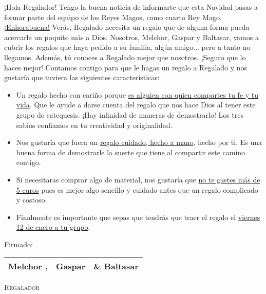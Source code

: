 \documentclass[11pt]{article}
\DeclareRobustCommand{\augiefamily}{%
  \fontfamily{augie}\fontseries{m}\fontshape{n}\selectfont}
\newcommand{\receiver}{Regalado\xspace}
\newcommand{\giver}{Regalador\xspace}
\begin{document}
\bsifamily


¡Hola \giver!
Tengo la buena noticia de informarte que esta Navidad pasas a formar parte del equipo de los Reyes Magos, como cuarto Rey Mago. \ul{¡Enhorabuena!}
Verás, \LARGE{\receiver} \large necesita un regalo que de alguna forma pueda acercarle un poquito más a Dios.
%
Nosotros, Melchor, Gaspar y Baltasar, vamos a cubrir los regalos que haya pedido a su familia, algún amigo... pero a tanto no llegamos. Además, tú conoces a \receiver mejor que nosotros. ¡Seguro que lo haces mejor!
Contamos contigo para que le hagas un regalo a \receiver y nos gustaría que tuviera las siguientes características:
\vspace{-1em}
\begin{itemize}
\item Un regalo hecho con cariño porque \ul{es alguien con quien compartes tu fe y tu vida}. Que le ayude a darse cuenta del regalo que nos hace Dios al tener este grupo de catequesis. ¡Hay infinidad de maneras de demostrarlo! Los tres sabios confiamos en tu creatividad y originalidad.
\item Nos gustaría que fuera un \ul{regalo cuidado, hecho a mano}, hecho por ti. Es una buena forma de demostrarle la suerte que tiene al compartir este camino contigo.
\item Si necesitaras comprar algo de material, nos gustaría que \ul{no te gastes más de 5 euros} pues es mejor algo sencillo y cuidado antes que un regalo complicado y costoso.
\item Finalmente es importante que sepas que tendrás que traer el regalo el \LARGE{\ul{viernes 12 de enero a tu grupo}.} \large 
\end{itemize}

Firmado:
\begin{center}
\begin{tabular}{ccc}
\augiefamily Melchor ,& \augiefamily Gaspar & \augiefamily \& Baltasar\\\hline
\end{tabular}
\end{center}

\newpage


\Fontauri\bfseries\slshape


\vspace*{\fill}
\begin{center}
{\fontsize{65}{130}\textsc{\giver}}
\end{center}
\vspace*{\fill}
\end{document}
